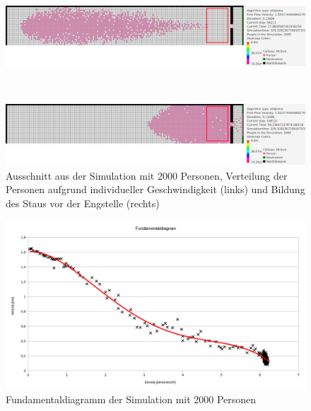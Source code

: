 \begin{figure}
\centering
\begin{minipage}{1\textwidth}
\centering
  \includegraphics[width=1\linewidth]{abbildungen/engstelle/2000P/engstelle2000personenVORmessbereich.png}
\end{minipage}%
\\
\begin{minipage}{1\textwidth}
\centering
  \includegraphics[width=1\linewidth]{abbildungen/engstelle/2000P/engstelle2000personenMAXmessbereich.png} 
 \end{minipage}
\caption{Ausschnitt aus der Simulation mit 2000 Personen, Verteilung der Personen aufgrund individueller Geschwindigkeit (links) und Bildung des Staus vor der Engstelle (rechts)}
\label{fig:engstelle2000p}
\end{figure}

\begin{figure}[ht]
	\centering
  \includegraphics[width=\textwidth]{abbildungen/engstelle/2000P/fundamentalDiagram2000persons.png}
	\caption{Fundamentaldiagramm der Simulation mit 2000 Personen}
	\label{fig:engstelle2000pFUNDA}
\end{figure}

